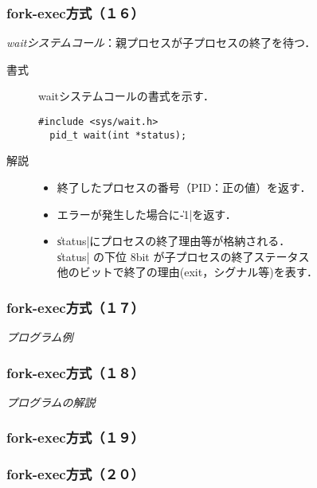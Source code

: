\documentclass{beamer}                 %
\begin{document}
\begin{frame}[fragile]
  \frametitle{fork-exec方式（１６）}
  \emph{waitシステムコール}：親プロセスが子プロセスの終了を待つ．

  \begin{description}
  \item[書式] waitシステムコールの書式を示す．

\begin{lstlisting}[numbers=none]
  #include <sys/wait.h>
  pid_t wait(int *status);
\end{lstlisting}

  \item[解説] 
    \begin{itemize}
    \item 終了したプロセスの番号（PID：正の値）を返す．
    \item エラーが発生した場合に\|-1|を返す．
    \item \|status|にプロセスの終了理由等が格納される．\\
      \|status| の下位 8bit が子プロセスの終了ステータス \\
      他のビットで終了の理由(exit，シグナル等)を表す．
    \end{itemize}
  \end{description}
\end{frame}

\begin{frame}[fragile]
  \frametitle{fork-exec方式（１７）}
  \emph{プログラム例}
\end{frame}

\begin{frame}[fragile]
  \frametitle{fork-exec方式（１８）}
  \emph{プログラムの解説}
\end{frame}

\begin{frame}[fragile]
  \frametitle{fork-exec方式（１９）}
\end{frame}

\begin{frame}[fragile]
  \frametitle{fork-exec方式（２０）}
\end{frame}
\end{document}
